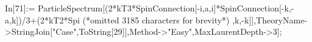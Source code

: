 In[71]:= ParticleSpectrum[(2*kT3*SpinConnection[-i,a,i]*SpinConnection[-k,-a,k])/3+(2*kT2*Spi (*omitted 3185 characters for brevity*) ,k,-k]],TheoryName->StringJoin["Case",ToString[29]],Method->"Easy",MaxLaurentDepth->3];